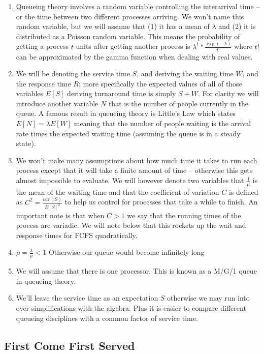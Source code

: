 \begin{enumerate}
\item Queueing theory involves a random variable controlling the interarrival time -- or the time between two different processes arriving.
  We won't name this random variable, but we will assume that (1) it has a mean of $\lambda$ and (2) it is distributed as a Poisson random variable.
  This means the probability of getting a process $t$ units after getting another process is $\lambda^t * \frac{\exp(-\lambda)}{t!}$ where $t!$ can be approximated by the gamma function when dealing with real values.
\item We will be denoting the service time $S$, and deriving the waiting time $W$, and the response time $R$; more specifically the expected values of all of those variables $E[S]$ deriving turnaround time is simply $S + W$.
  For clarity we will introduce another variable $N$ that is the number of people currently in the queue.
  A famous result in queueing theory is Little's Law which states $E[N] = \lambda E[W]$ meaning that the number of people waiting is the arrival rate times the expected waiting time (assuming the queue is in a steady state).
\item We won't make many assumptions about how much time it takes to run each process except that it will take a finite amount of time -- otherwise this gets almost impossible to evaluate.
We will however denote two variables that $\frac{1}{\mu}$ is the mean of the waiting time and that the coefficient of variation $C$ is defined as $C^2 = \frac{var(S)}{E[S]^2}$ to help us control for processes that take a while to finish.
An important note is that when $C > 1$ we say that the running times of the process are variadic. We will note below that this rockets up the wait and response times for FCFS quadratically.
\item $\rho = \frac{\lambda}{\mu} < 1$ Otherwise our queue would become infinitely long
\item We will assume that there is one processor. This is known as a M/G/1 queue in queueing theory.
\item We'll leave the service time as an expectation $S$ otherwise we may run into over-simplifications with the algebra.
  Plus it is easier to compare different queueing disciplines with a common factor of service time.
\end{enumerate}

\subsection{First Come First Served}


